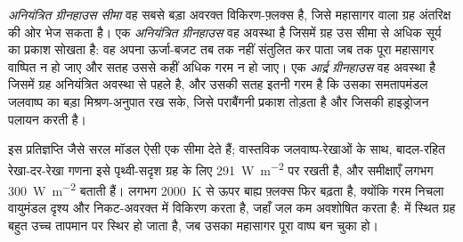 \begin{definition}[अनियंत्रित ग्रीनहाउस; अनियंत्रित ग्रीनहाउस सीमा; आर्द्र ग्रीनहाउस]\label{def:b3:planetary-atmospheres:runaway}
\emph{अनियंत्रित ग्रीनहाउस सीमा} वह सबसे बड़ा अवरक्त विकिरण-फ़्लक्स है,
जिसे महासागर वाला ग्रह अंतरिक्ष की ओर भेज सकता है। एक
\emph{अनियंत्रित ग्रीनहाउस} वह अवस्था है
जिसमें ग्रह उस सीमा से अधिक सूर्य का प्रकाश सोखता है: वह अपना ऊर्जा-बजट तब तक नहीं संतुलित कर पाता
जब तक पूरा महासागर वाष्पित न हो जाए और सतह उससे कहीं अधिक गरम न हो जाए। एक
\emph{आर्द्र ग्रीनहाउस} वह अवस्था है
जिसमें ग्रह अनियंत्रित अवस्था से पहले है, और उसकी सतह इतनी गरम है कि उसका समतापमंडल
जलवाष्प का बड़ा मिश्रण-अनुपात रख सके,
जिसे पराबैंगनी प्रकाश तोड़ता है और जिसकी हाइड्रोजन पलायन करती है।
\end{definition}

इस प्रतिज्ञप्ति जैसे सरल मॉडल ऐसी एक सीमा देते हैं;
वास्तविक जलवाष्प-रेखाओं के साथ, बादल-रहित रेखा-दर-रेखा गणना इसे
पृथ्वी-सदृश ग्रह के लिए \qty{291}{W.m^{-2}} पर रखती है, और
समीक्षाएँ लगभग \qty{300}{W.m^{-2}} बताती हैं। लगभग \qty{2000}{K} से ऊपर
बाह्य फ़्लक्स फिर बढ़ता है, क्योंकि गरम निचला वायुमंडल दृश्य और निकट-अवरक्त में विकिरण करता है,
जहाँ जल कम अवशोषित करता है:  में स्थित ग्रह
बहुत उच्च तापमान पर स्थिर हो जाता है, जब उसका महासागर
पूरा वाष्प बन चुका हो।

